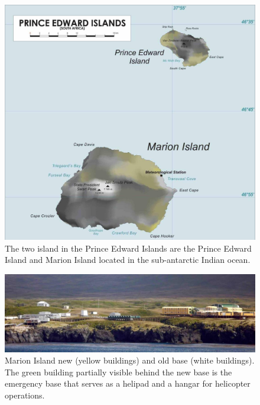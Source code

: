 \begin{figure}
	\centering
	\includegraphics[width=\linewidth]{Figures/marion}
	\caption{The two island in the Prince Edward Islands are the Prince Edward Island and Marion Island located in the sub-antarctic Indian ocean.}
	\label{fig:marion}
\end{figure}

\begin{figure}
	\centering
	\includegraphics[width=\linewidth]{Figures/base}
	\caption{Marion Island new (yellow buildings) and old base (white buildings). The green building partially visible behind the new base is the emergency base that serves as a helipad and a hangar for helicopter operations.}
	\label{fig:base}
\end{figure}

